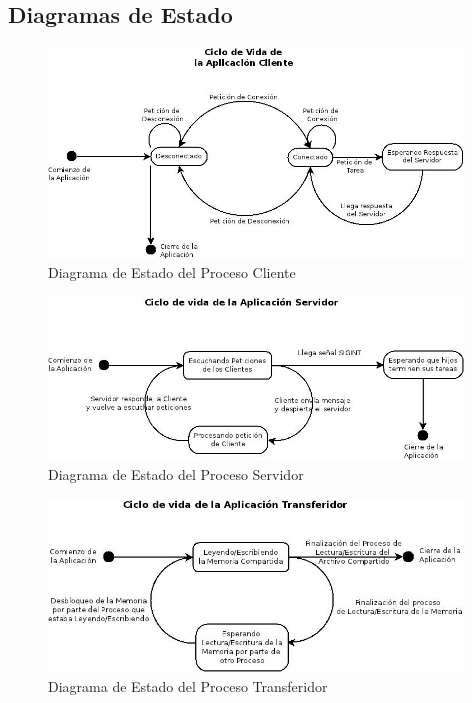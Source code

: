 \documentclass[a4paper,10pt]{article}
\begin{document}
		\subsection{Diagramas de Estado}
			\begin{figure}[!htpb]
				\centering
				\includegraphics[width=11cm]{DEstadoVidaCliente.jpeg}
				\caption{Diagrama de Estado del Proceso Cliente} \label{Img001}
			\end{figure}

			\begin{figure}[!htpb]
				\centering
				\includegraphics[width=11cm]{DEstadoVidaServidor.jpeg}
				\caption{Diagrama de Estado del Proceso Servidor} \label{Img002}
			\end{figure}

			\begin{figure}[!htpb]
				\centering
				\includegraphics[width=11cm]{DEstadoVidaTransferidor.jpeg}
				\caption{Diagrama de Estado del Proceso Transferidor}
			\end{figure}

		\newpage
\end{document}
